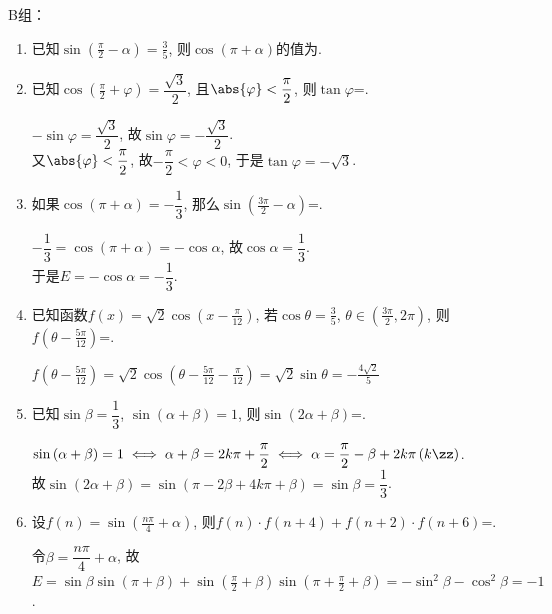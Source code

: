 B组：
\begin{enumerate}
\item 已知$\sin\left(\frac{\pi}{2}-\alpha\right)=\frac{3}{5}$, 则$\cos\left(\pi+\alpha\right)$的值为. 

\item 已知$\cos\left(\frac{\pi}{2}+\varphi\right)=\dfrac{\sqrt3}{2}$, 且$\abs{\varphi}<\dfrac{\pi}{2}$, 则$\tan\varphi$=. 
\begin{jieda}
$-\sin\varphi=\dfrac{\sqrt{3}}{2}$, 故$\sin\varphi=-\dfrac{\sqrt{3}}{2}$. \\
又$\abs{\varphi}<\dfrac{\pi}{2}$, 故$-\dfrac{\pi}{2}<\varphi<0$, 于是$\tan\varphi=-\sqrt{3}$. 
\end{jieda}

\item 如果$\cos\left(\pi+\alpha\right)=-\dfrac{1}{3}$, 那么$\sin\left(\frac{3\pi}{2}-\alpha\right)$=. 
\begin{jieda}
$-\dfrac{1}{3}=\cos\left(\pi+\alpha\right)=-\cos\alpha$, 故$\cos\alpha=\dfrac{1}{3}$. \\
于是$E=-\cos\alpha=-\dfrac{1}{3}$. 
\end{jieda}

\item 已知函数$f\left(x\right)=\sqrt2\cos\left(x-\frac{\pi}{12}\right)$, 若$\cos\theta=\frac{3}{5}$, $\theta\in\left(\frac{3\pi}{2},2\pi\right)$, 
则$f\left(\theta-\frac{5\pi}{12}\right)$=. 
\begin{jieda}
$f\left(\theta-\frac{5\pi}{12}\right)=\sqrt2\cos\left(\theta-\frac{5\pi}{12}-\frac{\pi}{12}\right)=\sqrt{2}\sin\theta=-\frac{4\sqrt{2}}{5}$
\end{jieda}


\item 已知$\sin\beta=\dfrac{1}{3}$, $\sin\left(\alpha+\beta\right)=1$, 则$\sin\left(2\alpha+\beta\right)$=. 
\begin{jieda}
$\sin\left(\alpha+\beta\right)=1\iff\alpha+\beta=2k\pi+\dfrac{\pi}{2}\iff\alpha=\dfrac{\pi}{2}-\beta+2k\pi\left(k\zz\right)$. \\
故$\sin\left(2\alpha+\beta\right)=\sin\left(\pi-2\beta+4k\pi+\beta\right)=\sin\beta=\dfrac{1}{3}$. 
\end{jieda}


\item 设$f\left(n\right)=\sin\left(\frac{n\pi}{4}+\alpha\right)$, 则$f\left(n\right)\cdot f\left(n+4\right)+f\left(n+2\right)\cdot f\left(n+6\right)$=. 
\begin{jieda}
令$\beta=\dfrac{n\pi}{4}+\alpha$, 故$E=\sin\beta\sin\left(\pi+\beta\right)+\sin\left(\frac{\pi}{2}+\beta\right)\sin\left(\pi+\frac{\pi}{2}+\beta\right)=-\sin^2\beta-\cos^2\beta=-1$. 
\end{jieda}


\end{enumerate}
